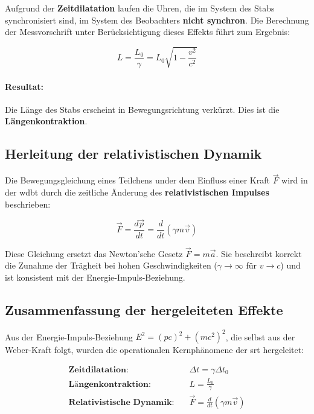 Aufgrund der \textbf{Zeitdilatation} laufen die Uhren, die im System des Stabs synchronisiert sind, im System des Beobachters \textbf{nicht synchron}. Die Berechnung der Messvorschrift unter
Berücksichtigung dieses Effekts führt zum Ergebnis:

\begin{equation}
    \label{eq:längenkontraktion}
    L = \frac{L_0}{\gamma} = L_0 \sqrt{1 - \frac{v^2}{c^2}}
\end{equation}

\paragraph{Resultat:} Die Länge des Stabs erscheint in Bewegungsrichtung verkürzt. Dies ist die \textbf{Längenkontraktion}.

\subsection{Herleitung der relativistischen Dynamik}
Die Bewegungsgleichung eines Teilchens under dem Einfluss einer Kraft $\vec{F}$ wird in der \gls{wdbt} durch die zeitliche Änderung des \textbf{relativistischen Impulses} beschrieben:

\begin{equation}
    \label{eq:relativistischer_impuls}
    \vec{F} = \frac{d\vec{p}}{dt} = \frac{d}{dt} (\gamma m \vec{v})
\end{equation}

Diese Gleichung ersetzt das Newton'sche Gesetz $\vec{F} = m\vec{a}$. Sie beschreibt korrekt die Zunahme der Trägheit bei hohen Geschwindigkeiten ($\gamma \to \infty$ für $v \to c$) und ist konsistent
mit der Energie-Impuls-Beziehung.

\subsection{Zusammenfassung der hergeleiteten Effekte}
Aus der Energie-Impuls-Beziehung $E^2 = (pc)^2 + (mc^2)^2$, die selbst aus der Weber-Kraft folgt, wurden die operationalen Kernphänomene der \gls{srt} hergeleitet:

\begin{align*}
\textbf{Zeitdilatation:} \quad & \Delta t = \gamma \Delta t_0 \\
\textbf{Längenkontraktion:} \quad & L = \frac{L_0}{\gamma} \\
\textbf{Relativistische Dynamik:} \quad & \vec{F} = \frac{d}{dt}(\gamma m \vec{v})
\end{align*}

